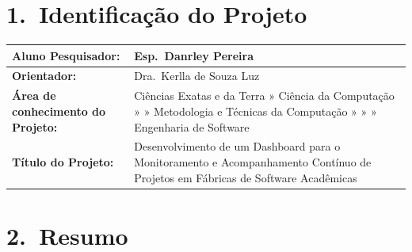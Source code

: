 \documentclass[
	12pt,
	openright,
	oneside,
	a4paper,
	brazil
]{abntex2}
\begin{document}
\frenchspacing

\pagestyle{fancy}

\textual
\pagestyle{fancy}


\section*{1.\ Identificação do Projeto}

\begin{tabular}{|p{4.5cm}|p{10cm}|}
\hline
\textbf{Aluno Pesquisador:} & Esp.\ Danrley Pereira \\
\hline
\textbf{Orientador:} & Dra.\ Kerlla de Souza Luz \\
\hline
\textbf{Área de conhecimento do Projeto:} &
Ciências Exatas e da Terra \newline
\hspace*{0.5em}» Ciência da Computação \newline
\hspace*{1.0em}» » Metodologia e Técnicas da Computação \newline
\hspace*{1.5em}» » » Engenharia de Software \\
\hline
\textbf{Título do Projeto:} &
Desenvolvimento de um Dashboard para o Monitoramento e Acompanhamento Contínuo de Projetos em Fábricas de Software Acadêmicas \\
\hline
\end{tabular}

\section*{2.\ Resumo}
\end{document}
